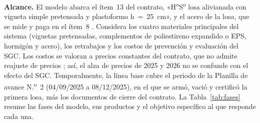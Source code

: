\begin{figure}[H]
\end{figure}

\textbf{Alcance.} El modelo abarca el ítem~13 del contrato, «H\textsuperscript{o}S\textsuperscript{o} losa alivianada con vigueta simple pretensada y plastoformo h~=~25~cm», y el acero de la losa, que se mide y paga en el ítem~8 \parencite[pp.~16, 20]{uatf2025pao2}. Considera los cuatro materiales principales del sistema (viguetas pretensadas, complementos de poliestireno expandido o EPS, hormigón y acero), los retrabajos y los costos de prevención y evaluación del SGC. Los costos se valoran a precios constantes del contrato, que no admite reajuste de precios \parencite[p.~95]{uatf2025pao2}; así, el alza de precios de 2025 y 2026 no se confunde con el efecto del SGC. Temporalmente, la línea base cubre el periodo de la Planilla de avance N.\textsuperscript{o}~2 (04/09/2025 a 08/12/2025), en el que se armó, vació y certificó la primera losa, más los documentos de cierre del contrato. La Tabla~\ref{tab:fases} resume las fases del modelo, sus productos y el objetivo específico al que responde cada una.

